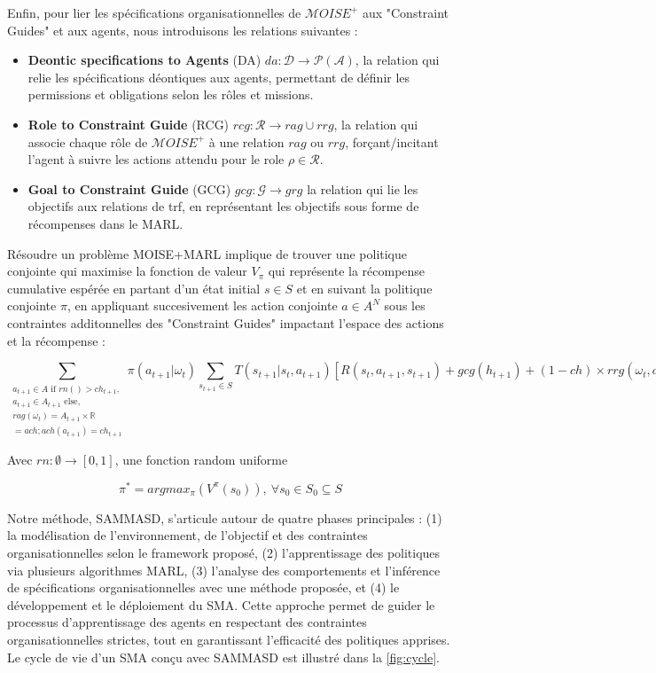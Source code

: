 \documentclass[sigconf,anonymous]{aamas}
\begin{document}
Enfin, pour lier les spécifications organisationnelles de $\mathcal{M}OISE^+$ aux "Constraint Guides" et aux agents, nous introduisons les relations suivantes :
\begin{itemize}
    \item \textbf{Deontic specifications to Agents} (DA) \quad $da: \mathcal{D} \rightarrow \mathcal{P}(\mathcal{A})$, la relation qui relie les spécifications déontiques aux agents, permettant de définir les permissions et obligations selon les rôles et missions.
    \item \textbf{Role to Constraint Guide} (RCG) \quad $rcg: \mathcal{R} \rightarrow rag \cup rrg$, la relation qui associe chaque rôle de $\mathcal{M}OISE^+$ à une relation $rag$ ou $rrg$, forçant/incitant l'agent à suivre les actions attendu pour le role $\rho \in \mathcal{R}$.
    \item \textbf{Goal to Constraint Guide} (GCG) \quad $gcg: \mathcal{G} \rightarrow grg$ la relation qui lie les objectifs aux relations de trf, en représentant les objectifs sous forme de récompenses dans le MARL.
\end{itemize}

Résoudre un problème MOISE+MARL implique de trouver une politique conjointe qui maximise la fonction de valeur $V_\pi$ qui représente la récompense cumulative espérée en partant d'un état initial $s \in S$ et en suivant la politique conjointe $\pi$, en appliquant succesivement les action conjointe $a \in A^N$ sous les contraintes additonnelles des "Constraint Guides" impactant l'espace des actions et la récompense :

\begin{figure*}
\[
  \sum_{\substack{
    a_{t+1} \in A \text{ if } rn() > ch_{t+1}, \\
    a_{t+1} \in A_{t+1} \text{ else, } \\ 
    rag(\omega_t) = A_{t+1} \times \mathbb{R} \\
    = ach ; ach(a_{t+1}) = ch_{t+1}
}}{\pi(a_{t+1} | \omega_t)} \sum_{s_{t+1} \in S}{T(s_{t+1} | s_t, a_{t+1}) [R(s_t,a_{t+1},s_{t+1}) + gcg(h_{t+1}) + (1-ch) \times rrg(\omega_t,a_{t+1})]}
\]
\end{figure*}

Avec $rn: \emptyset \to [0,1]$, une fonction random uniforme

\[
  \pi^* = argmax_{\pi}(V^\pi(s_0)), \ \forall s_0 \in S_0 \subseteq S
\]

Notre méthode, SAMMASD, s'articule autour de quatre phases principales : (1) la modélisation de l'environnement, de l'objectif et des contraintes organisationnelles selon le framework proposé, (2) l'apprentissage des politiques via plusieurs algorithmes MARL, (3) l'analyse des comportements et l'inférence de spécifications organisationnelles avec une méthode proposée, et (4) le développement et le déploiement du SMA. Cette approche permet de guider le processus d'apprentissage des agents en respectant des contraintes organisationnelles strictes, tout en garantissant l'efficacité des politiques apprises. Le cycle de vie d'un SMA conçu avec SAMMASD est illustré dans la \autoref{fig:cycle}.
\end{document}
